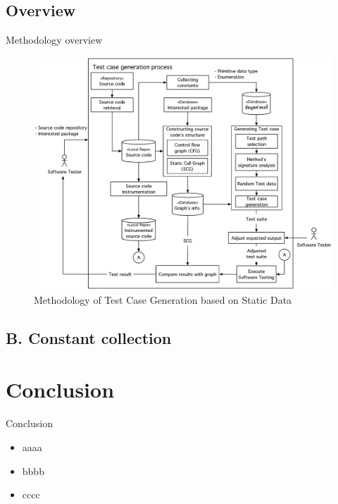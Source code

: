 \documentclass{beamer}
\begin{document}
\subsection{Overview}
\begin{frame}{Methodology overview}
    \begin{figure}
        \includegraphics[height=0.65\paperheight]{figure/Methodology.eps}
        \caption{Methodology of Test Case Generation based on Static Data}
        \label{fig:methodologyOverview}
    \end{figure}
\end{frame}

\subsection{B. Constant collection}

%
\section{Conclusion}
\begin{frame}{Conclusion}
    \begin{itemize}
        \item<1->aaaa
        \item<2->bbbb
        \item<3->cccc
    \end{itemize}
\end{frame}
\end{document}
